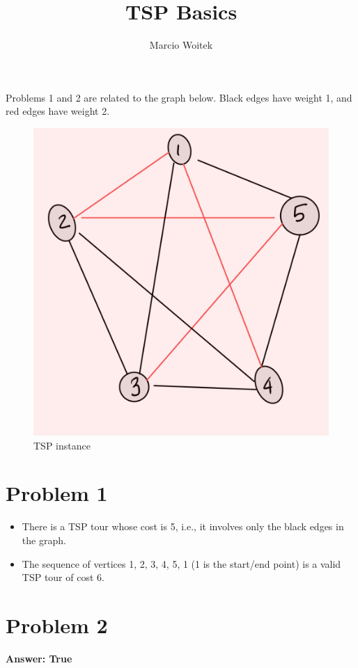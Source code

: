 \documentclass[11pt]{article}
\author{Marcio Woitek}
\date{}
\title{TSP Basics}
\begin{document}
\maketitle
\thispagestyle{empty}
\pagestyle{empty}

Problems 1 and 2 are related to the graph below. Black edges have weight 1, and
red edges have weight 2.
\begin{figure}[H]
  \centering
  \includegraphics[scale=0.15]{held_karp_graph.jpeg}
  \caption{TSP instance}
\end{figure}

\section*{Problem 1}
\label{sec:org5e485f4}
\begin{itemize}
\item There is a TSP tour whose cost is 5, i.e., it involves only the black edges in
the graph.
\item The sequence of vertices 1, 2, 3, 4, 5, 1 (1 is the start/end point) is a
valid TSP tour of cost 6.
\end{itemize}

\section*{Problem 2}
\label{sec:org77a526f}
\textbf{Answer: True}
\end{document}
